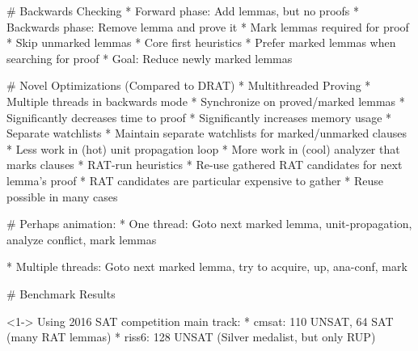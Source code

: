 \documentclass[fleqn]{beamer}
\begin{document}
# Backwards Checking
  * Forward phase: Add lemmas, but no proofs
  * Backwards phase: Remove lemma and prove it
    * Mark lemmas required for proof
    * Skip unmarked lemmas
  * Core first heuristics
    * Prefer marked lemmas when searching for proof
    * Goal: Reduce newly marked lemmas
  
# Novel Optimizations (Compared to DRAT)
  * Multithreaded Proving
    * Multiple threads in backwards mode
    * Synchronize on proved/marked lemmas
    * Significantly decreases time to proof
    * Significantly increases memory usage
  * Separate watchlists
    * Maintain separate watchlists for marked/unmarked clauses
    * Less work in (hot) unit propagation loop
    * More work in (cool) analyzer that marks clauses
  * RAT-run heuristics
    * Re-use gathered RAT candidates for next lemma's proof
    * RAT candidates are particular expensive to gather
    * Reuse possible in many cases

# Perhaps animation:
  * One thread: Goto next marked lemma, unit-propagation, analyze conflict, mark lemmas
  
  * Multiple threads: Goto next marked lemma, try to acquire, up, ana-conf, mark
    
    
\newcommand{\annot}[1]{{\footnotesize\color{red}{#1}}}

\newcommand{\uc}[2]{\uncover<#1->{#2}}  
# Benchmark Results
  \begin{uncoverenv}<1->
  Using 2016 SAT competition main track:
    * cmsat: 110 UNSAT, 64 SAT  (many RAT lemmas)
    * riss6: 128 UNSAT          (Silver medalist, but only RUP) 
  \end{uncoverenv}  

  \vfill
    
\end{document}
